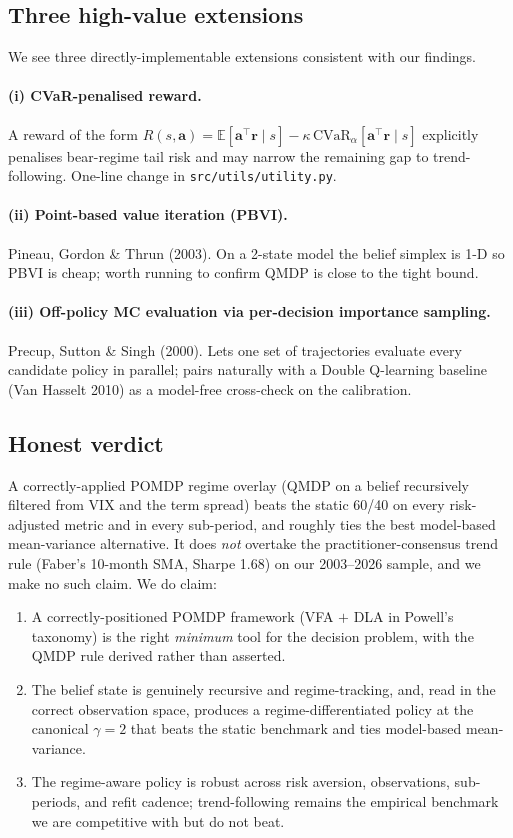\documentclass[11pt]{article}
\theoremstyle{plain1}
\theoremstyle{definition1}
\newcommand{\E}{\mathbb{E}}
\newcommand{\1}{\mathbf{1}}
\begin{document}
\subsection{Three high-value extensions}

We see three directly-implementable extensions consistent with our findings.

\paragraph{(i) CVaR-penalised reward.} A reward of the form $R(s, \mathbf{a}) = \E[\mathbf{a}^\top \mathbf{r} \mid s] - \kappa\,\mathrm{CVaR}_\alpha[\mathbf{a}^\top \mathbf{r} \mid s]$ explicitly penalises bear-regime tail risk and may narrow the remaining gap to trend-following. One-line change in \texttt{src/utils/utility.py}.

\paragraph{(ii) Point-based value iteration (PBVI).} Pineau, Gordon \& Thrun (2003). On a 2-state model the belief simplex is 1-D so PBVI is cheap; worth running to confirm QMDP is close to the tight bound.

\paragraph{(iii) Off-policy MC evaluation via per-decision importance sampling.} Precup, Sutton \& Singh (2000). Lets one set of trajectories evaluate every candidate policy in parallel; pairs naturally with a Double Q-learning baseline (Van Hasselt 2010) as a model-free cross-check on the calibration.

\subsection{Honest verdict}

A correctly-applied POMDP regime overlay (QMDP on a belief recursively filtered from VIX and the term spread) beats the static 60/40 on every risk-adjusted metric and in every sub-period, and roughly ties the best model-based mean-variance alternative. It does \emph{not} overtake the practitioner-consensus trend rule (Faber's 10-month SMA, Sharpe 1.68) on our 2003--2026 sample, and we make no such claim. We do claim:
\begin{enumerate}[leftmargin=1.5em]
  \item A correctly-positioned POMDP framework (VFA $+$ DLA in Powell's taxonomy) is the right \emph{minimum} tool for the decision problem, with the QMDP rule derived rather than asserted.
  \item The belief state is genuinely recursive and regime-tracking, and, read in the correct observation space, produces a regime-differentiated policy at the canonical $\gamma{=}2$ that beats the static benchmark and ties model-based mean-variance.
  \item The regime-aware policy is robust across risk aversion, observations, sub-periods, and refit cadence; trend-following remains the empirical benchmark we are competitive with but do not beat.
\end{enumerate}
\end{document}
